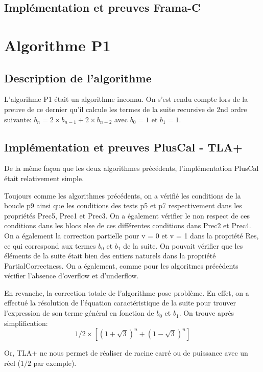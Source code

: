 \documentclass[a4paper,11pt, oneside]{book}
\begin{document}
		\section{Implémentation et preuves Frama-C}

	\chapter{Algorithme P1}

		\section{Description de l'algorithme}

		L'algorihme P1 était un algorithme inconnu. On s'est rendu compte lors de la
		preuve de ce dernier qu'il calcule les termes de la suite recursive de 2nd
		ordre suivante: $b_n = 2 \times b_{n-1} + 2 \times b_{n-2}$ avec $b_0 = 1$ et $b_1 = 1$.

		\section{Implémentation et preuves PlusCal - TLA+}

		De la même façon que les deux algorithmes précédents, l'implémentation PlusCal
		était relativement simple.

		Toujours comme les algorithmes précédents, on a vérifié les conditions de la boucle
		p9 ainsi que les conditions des tests p5 et p7 respectivement dans les propriétés
		Prec5, Prec1 et Prec3. On a également vérifier le non respect de ces conditions
		dans les blocs else de ces différentes conditions dans Prec2 et Prec4. On a
		également la correction partielle pour v = 0 et v = 1 dans la propriété Res,
		ce qui correspond aux termes $b_0$ et $b_1$ de la suite. On pouvait vérifier
		que les éléments de la suite était bien des entiers naturels dans la propriété
		PartialCorrectness. On a également, comme pour les algoritmes précédents vérifier
		l'absence d'overflow et d'underflow.

		En revanche, la correction totale de l'algorithme pose problème. En effet,
		on a effectué la résolution de l'équation caractéristique de la suite pour trouver
		l'expression de son terme général en fonction de $b_0$ et $b_1$.
		On trouve après simplification:
		$$1/2 \times [(1 + \sqrt 3)^n + (1 - \sqrt 3)^n]$$

		Or, TLA+ ne nous permet de réaliser de racine carré ou de puissance avec
		un réel ($1/2$ par exemple).
\end{document}
